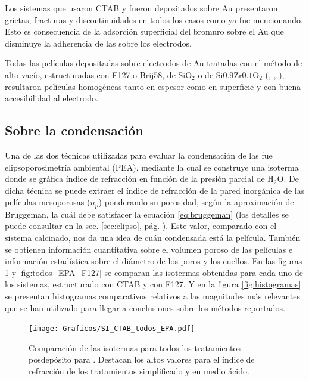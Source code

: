 			Los sistemas que usaron CTAB y fueron depositados sobre Au presentaron grietas, fracturas y discontinuidades en todos los casos como ya fue mencionando. Esto es consecuencia de la adsorción superficial del bromuro sobre el Au que disminuye la adherencia de las \pdm\space sobre los electrodos.
			
			Todas las películas depositadas sobre electrodos de Au tratadas con el método de alto vacío, estructuradas con F127 o Brij58, de SiO$_2$ o de Si$0.9$Zr$0.1$O$_2$ (\pdmF, \pdmZ, \pdmZB), resultaron películas homogéneas tanto en espesor como en superficie y con buena accesibilidad al electrodo.

	\subsection{Sobre la condensación}

		Una de las dos técnicas utilizadas para evaluar la condensación de las \pdm\space fue elipsoporosimetría ambiental (PEA), mediante la cual se construye una isoterma donde se gráfica índice de refracción en función de la presión parcial de H$_2$O. De dicha técnica se puede extraer el índice de refracción de la pared inorgánica de las películas mesoporosas ($n_p$) ponderando su porosidad, según la aproximación de Bruggeman, la cuál debe satisfacer la ecuación \ref{eq:bruggeman}\cite{violi2012} (los detalles se puede consultar en la sec. \ref{sec:elipso}, pág. \pageref{sec:elipso}). Este valor, comparado con el sistema calcinado, nos da una idea de cuán condensada está la película. También se obtienen información cuantitativa sobre el volumen poroso de las películas e información estadística sobre el diámetro de los poros y los cuellos. En las figuras \ref{fig:todos_EPA_CTAB} y \ref{fig:todos_EPA_F127} se comparan las isotermas obtenidas para cada uno de los sistemas, estructurado con CTAB y con F127. Y en la figura \ref{fig:histogramas} se presentan histogramas comparativos relativos a las magnitudes más relevantes que se han utilizado para llegar a conclusiones sobre los métodos reportados.
			\begin{figure}[b!]
		 	   	   \begin{center}
		 	   	   \texttt{[image: Graficos/SI\_CTAB\_todos\_EPA.pdf]}
			   	   \caption[Comparación PEA tratamientos alternativos (CTAB)]{Comparación de las isotermas para todos los tratamientos posdepósito para \pdmC. Destacan los altos valores para el índice de refracción de los tratamientos simplificado y en medio ácido.}
				   \label{fig:todos_EPA_CTAB}	
				   \end{center}
				   \end{figure}
		
